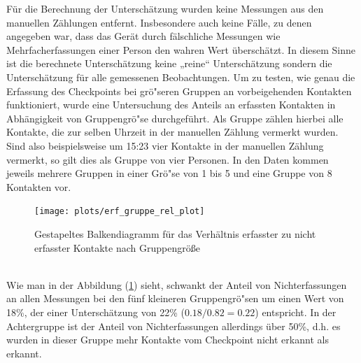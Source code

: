 \documentclass[12pt]{scrreprt}
\begin{document}
\noindent Für die Berechnung der Unterschätzung wurden keine Messungen aus den manuellen Zählungen entfernt. Insbesondere auch keine Fälle, zu denen angegeben war, dass das Gerät durch fälschliche Messungen wie Mehrfacherfassungen einer Person den wahren Wert überschätzt. In diesem Sinne ist die berechnete Unterschätzung keine „reine“ Unterschätzung sondern die Unterschätzung für alle gemessenen Beobachtungen.
Um zu testen, wie genau die Erfassung des Checkpoints bei grö"seren Gruppen an vorbeigehenden Kontakten funktioniert, wurde eine Untersuchung des Anteils an erfassten Kontakten in Abhängigkeit von Gruppengrö"se durchgeführt. Als Gruppe zählen hierbei alle Kontakte, die zur selben Uhrzeit in der manuellen Zählung vermerkt wurden. Sind also beispielsweise um 15:23 vier Kontakte in der manuellen Zählung vermerkt, so gilt dies als Gruppe von vier Personen. In den Daten kommen jeweils mehrere Gruppen in einer Grö"se von 1 bis 5 und eine Gruppe von 8 Kontakten vor. \\
\begin{figure}[h]
	\centering
	\texttt{[image: plots/erf\_gruppe\_rel\_plot]}
	\caption{Gestapeltes Balkendiagramm für das Verhältnis erfasster zu nicht erfasster Kontakte nach Gruppengröße}
	\label{pic:erf_gruppe_rel_plot}	
\end{figure}\\
\noindent Wie man in der Abbildung (\ref{pic:erf_gruppe_rel_plot}) sieht, schwankt der Anteil von Nichterfassungen an allen Messungen bei den fünf kleineren Gruppengrö"sen um einen Wert von 18\%, der einer Unterschätzung von 22\% ($0.18/0.82=0.22$) entspricht. In der Achtergruppe ist der Anteil von Nichterfassungen allerdings über 50\%, d.h. es wurden in dieser Gruppe mehr Kontakte vom Checkpoint nicht erkannt als erkannt.
\end{document}
